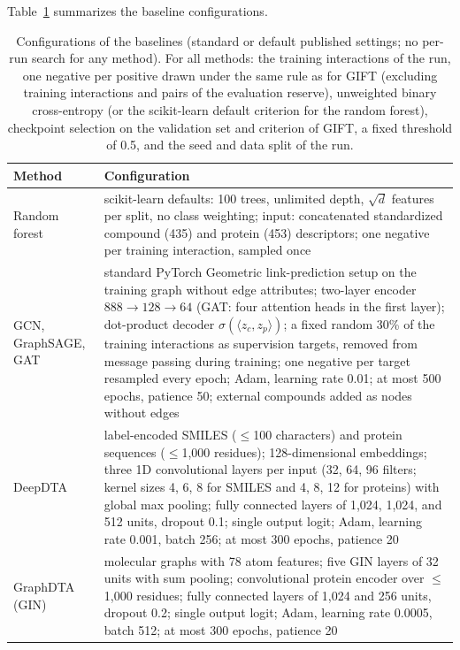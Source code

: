 \documentclass[11pt,letterpaper]{article}
\begin{document}
Table~\ref{tab:baselines} summarizes the baseline configurations.

\begin{table}[!htbp]
\centering
\caption{Configurations of the baselines (standard or default published settings; no per-run search for any method). For all methods: the training interactions of the run, one negative per positive drawn under the same rule as for GIFT (excluding training interactions and pairs of the evaluation reserve), unweighted binary cross-entropy (or the scikit-learn default criterion for the random forest), checkpoint selection on the validation set and criterion of GIFT, a fixed threshold of 0.5, and the seed and data split of the run.}
\label{tab:baselines}
\small
\begin{tabularx}{\textwidth}{l X}
\toprule
\textbf{Method} & \textbf{Configuration} \\
\midrule
Random forest & scikit-learn defaults: 100 trees, unlimited depth, $\sqrt{d}$ features per split, no class weighting; input: concatenated standardized compound (435) and protein (453) descriptors; one negative per training interaction, sampled once \\
\addlinespace
GCN, GraphSAGE, GAT & standard PyTorch Geometric link-prediction setup on the training graph without edge attributes; two-layer encoder $888\to128\to64$ (GAT: four attention heads in the first layer); dot-product decoder $\sigma(\langle z_c,z_p\rangle)$; a fixed random 30\% of the training interactions as supervision targets, removed from message passing during training; one negative per target resampled every epoch; Adam, learning rate 0.01; at most 500 epochs, patience 50; external compounds added as nodes without edges \\
\addlinespace
DeepDTA & label-encoded SMILES ($\leq$100 characters) and protein sequences ($\leq$1,000 residues); 128-dimensional embeddings; three 1D convolutional layers per input (32, 64, 96 filters; kernel sizes 4, 6, 8 for SMILES and 4, 8, 12 for proteins) with global max pooling; fully connected layers of 1,024, 1,024, and 512 units, dropout 0.1; single output logit; Adam, learning rate 0.001, batch 256; at most 300 epochs, patience 20 \\
\addlinespace
GraphDTA (GIN) & molecular graphs with 78 atom features; five GIN layers of 32 units with sum pooling; convolutional protein encoder over $\leq$1,000 residues; fully connected layers of 1,024 and 256 units, dropout 0.2; single output logit; Adam, learning rate 0.0005, batch 512; at most 300 epochs, patience 20 \\

\end{tabularx}
\end{table}
\end{document}
